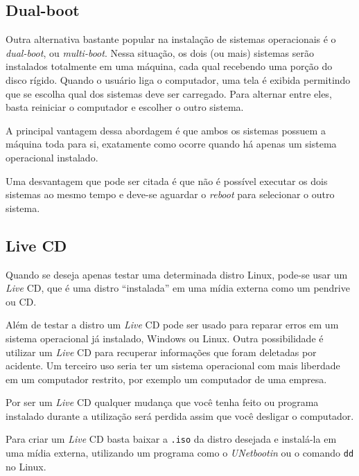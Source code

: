 \documentclass{handout_utfpr}
\begin{document}
\subsection{Dual-boot}
Outra alternativa bastante popular na instalação de sistemas operacionais é o \textit{dual-boot}, ou \textit{multi-boot}. Nessa situação, os dois (ou mais) sistemas serão instalados totalmente em uma máquina, cada qual recebendo uma porção do disco rígido. Quando o usuário liga o computador, uma tela é exibida permitindo que se escolha qual dos sistemas deve ser carregado. Para alternar entre eles, basta reiniciar o computador e escolher o outro sistema.

A principal vantagem dessa abordagem é que ambos os sistemas possuem a máquina toda para si, exatamente como ocorre quando há apenas um sistema operacional instalado.

Uma desvantagem que pode ser citada é que não é possível executar os dois sistemas ao mesmo tempo e deve-se aguardar o \textit{reboot} para selecionar o outro sistema.


\subsection{Live CD}

Quando se deseja apenas testar uma determinada distro Linux, pode-se usar um \textit{Live} CD, que é uma distro ``instalada'' em uma mídia externa como um pendrive ou CD. 

Além de testar a distro um \textit{Live} CD pode ser usado para reparar erros em um sistema operacional já instalado, Windows ou Linux. Outra possibilidade é utilizar um \textit{Live} CD para recuperar informações que foram deletadas por acidente. Um terceiro uso seria ter um sistema operacional com mais liberdade em um computador restrito, por exemplo um computador de uma empresa.

Por ser um \textit{Live} CD qualquer mudança que você tenha feito ou programa instalado durante a utilização será perdida assim que você desligar o computador.

Para criar um \textit{Live} CD basta baixar a \texttt{.iso} da distro desejada e instalá-la em uma mídia externa, utilizando um programa como o \emph{UNetbootin} ou o comando \texttt{dd} no Linux.
\end{document}
